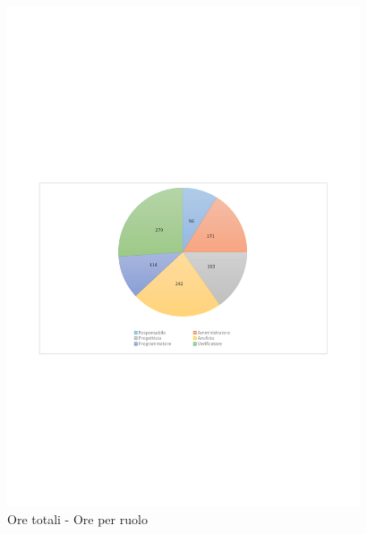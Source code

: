 \documentclass[../PianoProgetto.tex]{subfiles}
\begin{document}
	\begin{figure}[H]
		\centering
		\includegraphics[width=0.93\textwidth , trim=1.5cm 9cm 1.5cm 9cm]{grafici/Riepilogo/Totali/ore-ruolo}
			\caption{Ore totali - Ore per ruolo}
		\label{fig:CircleChart-totale_ore_r}
	\end{figure}	
\vfill
\end{document}
